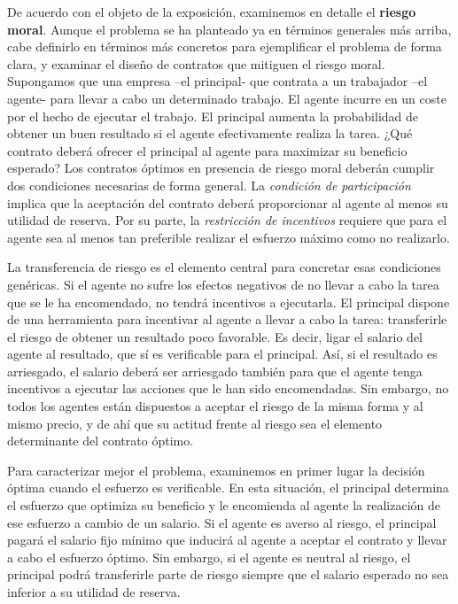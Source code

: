 \documentclass{nuevotema}
\begin{document}
De acuerdo con el objeto de la exposición, examinemos en detalle el \textbf{riesgo moral}. Aunque el problema se ha planteado ya en términos generales más arriba, cabe definirlo en términos más concretos para ejemplificar el problema de forma clara, y examinar el diseño de contratos que mitiguen el riesgo moral. Supongamos que una empresa --el principal- que contrata a un trabajador --el agente- para llevar a cabo un determinado trabajo. El agente incurre en un coste por el hecho de ejecutar el trabajo. El principal aumenta la probabilidad de obtener un buen resultado si el agente efectivamente realiza la tarea. ¿Qué contrato deberá ofrecer el principal al agente para maximizar su beneficio esperado? Los contratos óptimos en presencia de riesgo moral deberán cumplir dos condiciones necesarias de forma general. La \textit{condición de participación} implica que la aceptación del contrato deberá proporcionar al agente al menos su utilidad de reserva. Por su parte, la \textit{restricción de incentivos} requiere que para el agente sea al menos tan preferible realizar el esfuerzo máximo como no realizarlo. 

La transferencia de riesgo es el elemento central para concretar esas condiciones genéricas. Si el agente no sufre los efectos negativos de no llevar a cabo la tarea que se le ha encomendado, no tendrá incentivos a ejecutarla. El principal dispone de una herramienta para incentivar al agente a llevar a cabo la tarea: transferirle el riesgo de obtener un resultado poco favorable. Es decir, ligar el salario del agente al resultado, que sí es verificable para el principal. Así, si el resultado es arriesgado, el salario deberá ser arriesgado también para que el agente tenga incentivos a ejecutar las acciones que le han sido encomendadas. Sin embargo, no todos los agentes están dispuestos a aceptar el riesgo de la misma forma y al mismo precio, y de ahí que su actitud frente al riesgo sea el elemento determinante del contrato óptimo. 

Para caracterizar mejor el problema, examinemos en primer lugar la decisión óptima cuando el esfuerzo es verificable. En esta situación, el principal determina el esfuerzo que optimiza su beneficio y le encomienda al agente la realización de ese esfuerzo a cambio de un salario. Si el agente es averso al riesgo, el principal pagará el salario fijo mínimo que inducirá al agente a aceptar el contrato y llevar a cabo el esfuerzo óptimo. Sin embargo, si el agente es neutral al riesgo, el principal podrá transferirle parte de riesgo siempre que el salario esperado no sea inferior a su utilidad de reserva.
\end{document}
